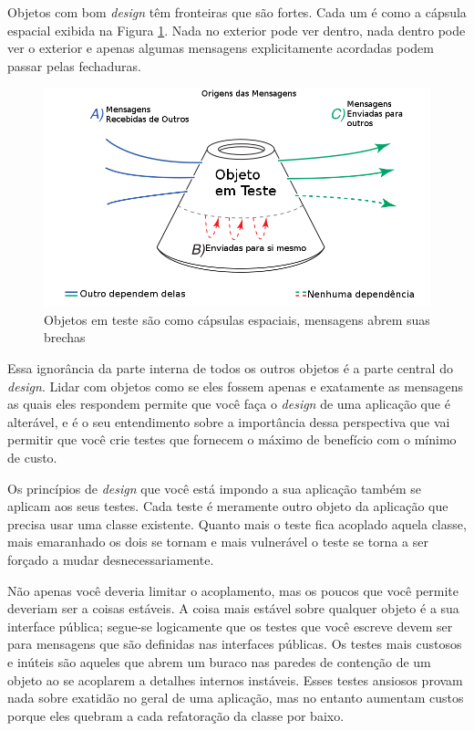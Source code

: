 Objetos com bom \textit{design} têm fronteiras que são fortes. Cada um é como a cápsula espacial exibida na Figura \ref{img:origem_mensagens}. Nada no exterior pode ver dentro, nada dentro pode ver o exterior e apenas algumas mensagens explicitamente acordadas podem passar pelas fechaduras.

\begin{figure}[!htbp]
  \center
  \includegraphics[scale=0.40]{imagens/origem_mensagens.png}
  \caption{Objetos em teste são como cápsulas espaciais, mensagens abrem suas brechas}
  \label{img:origem_mensagens}
\end{figure}

Essa ignorância da parte interna de todos os outros objetos é a parte central do \textit{design}. Lidar com objetos como se eles fossem apenas e exatamente as mensagens as quais eles respondem permite que você faça o \textit{design} de uma aplicação que é alterável, e é o seu entendimento sobre a importância dessa perspectiva que vai permitir que você crie testes que fornecem o máximo de benefício com o mínimo de custo.

Os princípios de \textit{design} que você está impondo a sua aplicação também se aplicam aos seus testes. Cada teste é meramente outro objeto da aplicação que precisa usar uma classe existente. Quanto mais o teste fica acoplado aquela classe, mais emaranhado os dois se tornam e mais vulnerável o teste se torna a ser forçado a mudar desnecessariamente.

Não apenas você deveria limitar o acoplamento, mas os poucos que você permite deveriam ser a coisas estáveis. A coisa mais estável sobre qualquer objeto é a sua interface pública; segue-se logicamente que os testes que você escreve devem ser para mensagens que são definidas nas interfaces públicas. Os testes mais custosos e inúteis são aqueles que abrem um buraco nas paredes de contenção de um objeto ao se acoplarem a detalhes internos instáveis. Esses testes ansiosos provam nada sobre exatidão no geral de uma aplicação, mas no entanto aumentam custos porque eles quebram a cada refatoração da classe por baixo.

